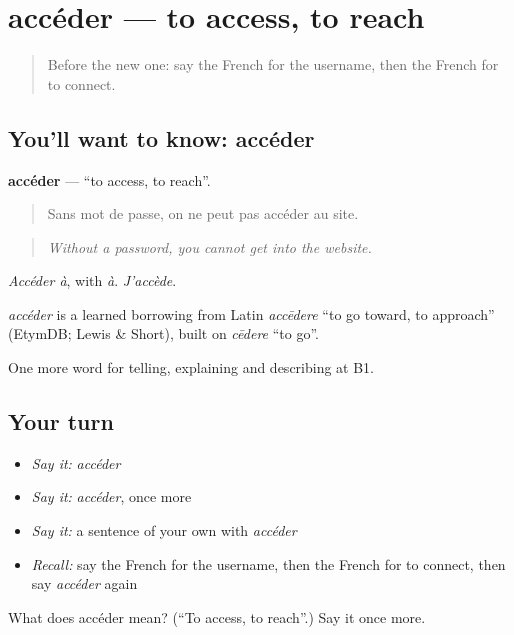 \section[accéder]{accéder — to access, to reach}

\label{lesson:FR-C395-acceder}



\begin{quote}
Before the new one: say the French for the username, then the French for to connect.
\end{quote}

\subsection*{You'll want to know: accéder}
\textbf{accéder} — \textquotedblleft{}to access, to reach\textquotedblright{}.

\begin{quote}
Sans mot de passe, on ne peut pas accéder au site.
\end{quote}

\begin{quote}
\emph{Without a password, you cannot get into the website.}
\end{quote}

\emph{Accéder à}, with \emph{à}. \emph{J'accède}.

\begin{cousinweb}
\emph{accéder} is a learned borrowing from Latin \emph{accēdere} \textquotedblleft{}to go toward, to approach\textquotedblright{} (EtymDB; Lewis \& Short), built on \emph{cēdere} \textquotedblleft{}to go\textquotedblright{}.
\end{cousinweb}

\begin{grammarlens}[title={What you've built}]
One more word for telling, explaining and describing at B1.
\end{grammarlens}

\subsection*{Your turn}
\begin{itemize}
\raggedright
  \item \emph{Say it:} \emph{accéder}
  \item \emph{Say it:} \emph{accéder}, once more
  \item \emph{Say it:} a sentence of your own with \emph{accéder}
  \item \emph{Recall:} say the French for the username, then the French for to connect, then say \emph{accéder} again
\end{itemize}

\begin{tcolorbox}[breakable,colback=teal!4,colframe=teal!35!black,title={Before you move on}]
What does accéder mean? (\textquotedblleft{}To access, to reach\textquotedblright{}.) Say it once more.
\end{tcolorbox}
